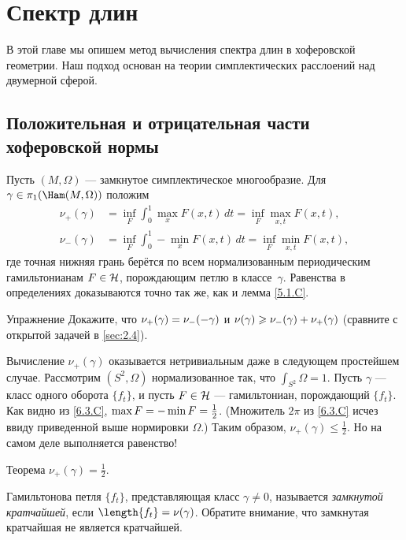 \chapter{Спектр длин}\label{chap:9}

В этой главе мы опишем метод вычисления спектра длин в хоферовской геометрии.
Наш подход основан на теории симплектических расслоений над двумерной сферой.

\section{Положительная и отрицательная части хоферовской нормы}

Пусть $(M, \Omega)$ — замкнутое симплектическое многообразие.
Для $\gamma \in \pi_1 (\Ham(M, \Omega))$ положим \index[symb]{$\nu_\pm$}
\begin{align*}
\nu_+ (\gamma) &= \inf_F \int_0^1 \max_x F (x, t)\,dt = \inf_F \max_{x,t}F (x, t),
\\ 
\nu_- (\gamma) &= \inf_F \int_0^1 -\min_x F (x, t)\,dt = \inf_F \min_{x,t}F (x, t),
\end{align*}
где точная нижняя грань берётся по всем нормализованным периодическим
гамильтонианам $F \in \mathcal{H}$, порождающим петлю в классе~$\gamma$. 
Равенства в определениях доказываются точно так же, как и лемма \ref{5.1.C}.

\begin{ex*}{Упражнение}
Докажите, что $\nu_+ (\gamma) \z= \nu_- (-\gamma)$ и $\nu(\gamma) \z\ge
\nu_- (\gamma) \z+ \nu_+ (\gamma)$ 
(сравните с открытой задачей в \ref{sec:2.4}).
\end{ex*}

Вычисление $\nu_+ (\gamma)$ оказывается нетривиальным даже в следующем
простейшем случае. 
Рассмотрим $(S^2, \Omega)$ нормализованное так, что $\int_{S^2} \Omega = 1$.
Пусть $\gamma$ — класс одного оборота $\{f_t\}$, и пусть $F \in \mathcal{H}$
— гамильтониан, порождающий $\{f_t\}$. 
Как видно из \ref{6.3.C}, $\max F \z= - \min F = \frac12$.
(Множитель $2\pi$ из \ref{6.3.C} исчез ввиду приведенной выше
нормировки $\Omega$.) 
Таким образом, $\nu_+ (\gamma) \le \frac12$.
Но на самом деле выполняется равенство!

\begin{thm}{Теорема}\label{9.1.A}
$\nu_+ (\gamma) = \frac12$.
\end{thm}

Гамильтонова петля $\{f_t \}$, представляющая класс $\gamma \ne 0$,
называется \emph{замкнутой кратчайшей}, если $\length\{f_t \} =
\nu(\gamma)$.
Обратите внимание, что замкнутая кратчайшая не является кратчайшей.

